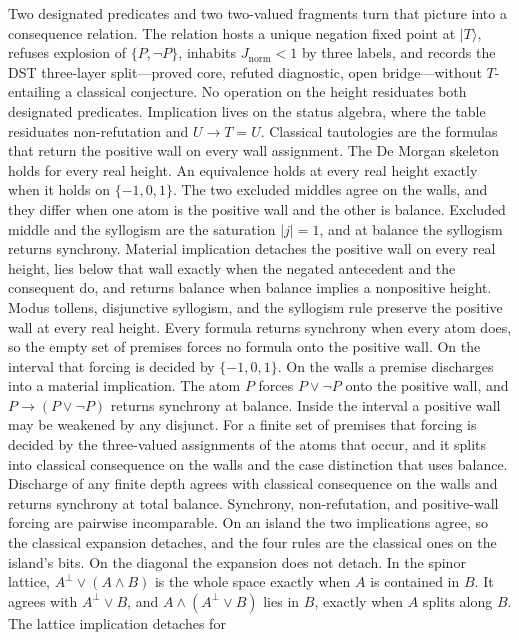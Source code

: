 \documentclass[a4paper]{article}
\theoremstyle{definition}
\newcommand{\Jnorm}{J_{\mathrm{norm}}}
\begin{document}
Two designated predicates and two two-valued fragments turn that
picture into a consequence relation. The relation hosts a unique
negation fixed point at \(\lvert T\rangle\), refuses explosion of
\(\{P,\neg P\}\), inhabits \(\Jnorm<1\) by three labels, and records
the DST three-layer split---proved core, refuted diagnostic, open
bridge---without \(T\)-entailing a classical conjecture. No operation on the height residuates both designated predicates.
Implication lives on the status algebra, where the table residuates
non-refutation and \(U\to T=U\). Classical tautologies are the formulas
that return the positive wall on every wall assignment. The De Morgan
skeleton holds for every real height. An equivalence holds at every
real height exactly when it holds on \(\{-1,0,1\}\). The two excluded
middles agree on the walls, and they differ when one atom is the
positive wall and the other is balance. Excluded middle and the
syllogism are the saturation \(|j|=1\), and at balance the syllogism
returns synchrony. Material implication detaches the positive wall on every
real height, lies below that wall exactly when the negated antecedent
and the consequent do, and returns balance when balance implies a nonpositive height.
Modus tollens, disjunctive syllogism, and the syllogism rule preserve the
positive wall at every real height. Every formula returns synchrony when
every atom does, so the empty set of premises forces no formula onto the
positive wall. On the interval that forcing is decided by \(\{-1,0,1\}\).
On the walls a premise discharges into a material implication. The atom
\(P\) forces \(P\vee\neg P\) onto the positive wall, and
\(P\to(P\vee\neg P)\) returns synchrony at balance. Inside the interval a
positive wall may be weakened by any disjunct.
For a finite set of premises that forcing is decided by the three-valued
assignments of the atoms that occur, and it splits into classical
consequence on the walls and the case distinction that uses balance.
Discharge of any finite depth agrees with classical consequence on the
walls and returns synchrony at total balance. Synchrony,
non-refutation, and positive-wall forcing are pairwise incomparable.
On an island the two implications agree, so the classical expansion
detaches, and the four rules are the classical ones on the island's
bits. On the diagonal the expansion does not detach.
In the spinor lattice, \(A^\perp\vee(A\wedge B)\) is the
whole space exactly when \(A\) is contained in \(B\). It agrees with
\(A^\perp\vee B\), and \(A\wedge(A^\perp\vee B)\) lies in \(B\), exactly
when \(A\) splits along \(B\). The lattice implication detaches for
\end{document}
